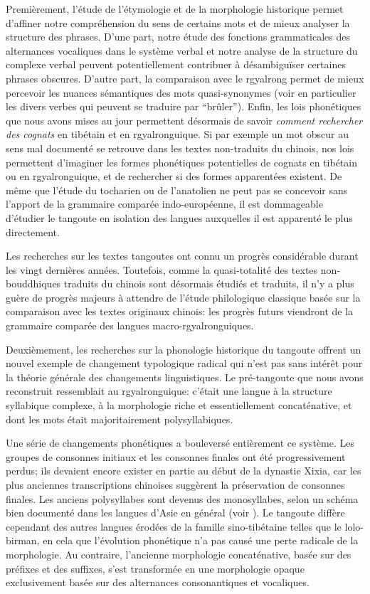 \documentclass[oldfontcommands,twoside,a4paper,11pt,draft]{memoir}
\begin{document}
Premièrement, l'étude de l'étymologie et de la morphologie historique   permet  d'affiner notre compréhension du sens de certains mots et de mieux analyser la structure des phrases. D'une part, notre étude des fonctions grammaticales des alternances vocaliques dans le système verbal et notre analyse de la structure du complexe verbal peuvent potentiellement contribuer à désambiguïser certaines phrases obscures. D'autre part, la comparaison avec le rgyalrong permet de mieux percevoir les nuances sémantiques des mots quasi-synonymes (voir en particulier les divers verbes qui peuvent se traduire par ``brûler''). Enfin, les lois phonétiques que nous avons mises au jour permettent désormais de savoir \textit{comment rechercher des cognats} en tibétain et en rgyalronguique. Si par exemple un mot obscur au sens mal documenté se retrouve dans les textes non-traduits du chinois, nos lois permettent d'imaginer les formes phonétiques potentielles de cognats en tibétain ou en rgyalronguique, et de rechercher si des formes apparentées existent. De même que l'étude du tocharien ou de l'anatolien ne peut pas se concevoir sans l'apport de la grammaire comparée indo-européenne, il est dommageable d'étudier le tangoute en isolation des langues auxquelles il est apparenté le plus directement.

Les recherches sur les textes tangoutes ont connu un progrès considérable durant les vingt  dernières années. Toutefois, comme la quasi-totalité des textes non-bouddhiques traduits du chinois sont désormais étudiés et traduits, il n'y a plus guère de progrès majeurs à attendre de l'étude philologique classique  basée sur la comparaison avec les textes originaux chinois: les progrès futurs viendront de la grammaire comparée des langues macro-rgyalronguiques.

Deuxièmement, les recherches sur la phonologie historique du tangoute offrent un nouvel exemple de changement typologique radical qui n'est pas sans intérêt pour la théorie générale des changements linguistiques. Le pré-tangoute que nous avons reconstruit ressemblait au rgyalronguique: c'était une langue à la structure syllabique  complexe, à la morphologie riche et essentiellement concaténative, et dont les mots était majoritairement polysyllabiques. 



Une série de changements phonétiques a bouleversé entièrement ce système. Les groupes de consonnes initiaux et les consonnes finales ont été progressivement perdus; ils devaient encore exister en partie au début de la dynastie Xixia, car les plus anciennes transcriptions chinoises suggèrent la préservation de consonnes finales. Les anciens polysyllabes sont devenus des monosyllabes, selon un schéma bien documenté dans les langues d'Asie en général (voir \citealt{michaud08monosyl}). Le tangoute diffère cependant des autres langues érodées de la famille sino-tibétaine telles que le lolo-birman, en cela que l'évolution phonétique n'a pas causé une perte radicale de la morphologie. Au contraire, l'ancienne morphologie concaténative, basée sur des préfixes et des suffixes, s'est transformée en une morphologie opaque exclusivement basée sur des alternances consonantiques et vocaliques. 
\end{document}

